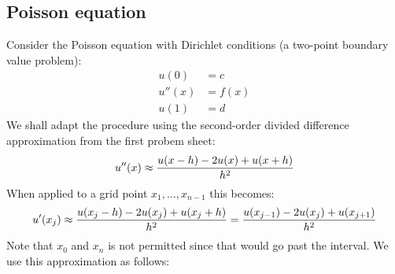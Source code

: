 \subsection{Poisson equation}
Consider the Poisson equation with Dirichlet conditions (a two-point boundary value problem):
\begin{align*}
u(0) &= c \\
u''(x) &= f(x) \\
u(1) &= d
\end{align*}
We shall adapt the procedure using the second-order divided difference approximation from the first probem sheet:
\[
u''(x) \ensuremath{\approx} {u(x-h) - 2u(x) + u(x+h)\over h^2}
\]
When applied to a grid point $x_1,\ensuremath{\ldots},x_{n-1}$ this becomes:
\[
u'(x_j) \ensuremath{\approx} {u(x_j-h) - 2u(x_j) + u(x_j+h)\over h^2} = {u(x_{j-1}) - 2u(x_j) + u(x_{j+1})\over h^2}
\]
Note that $x_0$ and $x_n$ is not permitted since that would go past the interval. We use this approximation as follows:


